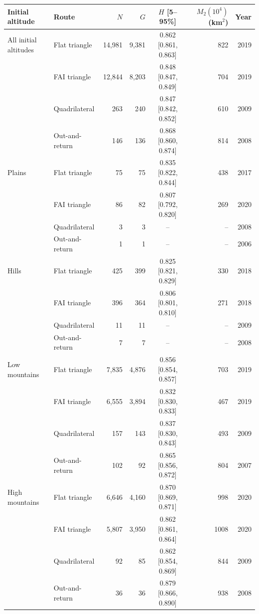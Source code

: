 \begin{tabular}{llrrcrr}
\toprule
Initial altitude & Route & $N$ & $G$ & $H$ [5--95\%] & $M_2(10^4)$ (km$^2$) & Year \\
\midrule
All initial altitudes & Flat triangle & 14,981 & 9,381 & 0.862 [0.861, 0.863] & 822 & 2019 \\
 & FAI triangle & 12,844 & 8,203 & 0.848 [0.847, 0.849] & 704 & 2019 \\
 & Quadrilateral & 263 & 240 & 0.847 [0.842, 0.852] & 610 & 2009 \\
 & Out-and-return & 146 & 136 & 0.868 [0.860, 0.874] & 814 & 2008 \\
\midrule
Plains & Flat triangle & 75 & 75 & 0.835 [0.822, 0.844] & 438 & 2017 \\
 & FAI triangle & 86 & 82 & 0.807 [0.792, 0.820] & 269 & 2020 \\
 & Quadrilateral & 3 & 3 & -- & -- & 2008 \\
 & Out-and-return & 1 & 1 & -- & -- & 2006 \\
\midrule
Hills & Flat triangle & 425 & 399 & 0.825 [0.821, 0.829] & 330 & 2018 \\
 & FAI triangle & 396 & 364 & 0.806 [0.801, 0.810] & 271 & 2018 \\
 & Quadrilateral & 11 & 11 & -- & -- & 2009 \\
 & Out-and-return & 7 & 7 & -- & -- & 2008 \\
\midrule
Low mountains & Flat triangle & 7,835 & 4,876 & 0.856 [0.854, 0.857] & 703 & 2019 \\
 & FAI triangle & 6,555 & 3,894 & 0.832 [0.830, 0.833] & 467 & 2019 \\
 & Quadrilateral & 157 & 143 & 0.837 [0.830, 0.843] & 493 & 2009 \\
 & Out-and-return & 102 & 92 & 0.865 [0.856, 0.872] & 804 & 2007 \\
\midrule
High mountains & Flat triangle & 6,646 & 4,160 & 0.870 [0.869, 0.871] & 998 & 2020 \\
 & FAI triangle & 5,807 & 3,950 & 0.862 [0.861, 0.864] & 1008 & 2020 \\
 & Quadrilateral & 92 & 85 & 0.862 [0.854, 0.869] & 844 & 2009 \\
 & Out-and-return & 36 & 36 & 0.879 [0.866, 0.890] & 938 & 2008 \\
\bottomrule
\end{tabular}
